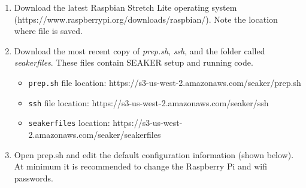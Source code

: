 \documentclass[12pt]{article}
\begin{document}
\begin{enumerate}
  \item Download the latest Raspbian Stretch Lite operating system\\
  (https://www.raspberrypi.org/downloads/raspbian/).
  Note the location where file is saved.
  \item Download the most recent copy of {\em prep.sh}, {\em \gls{ssh}}, and the 
  folder called {\em seakerfiles}. These files
  contain SEAKER setup and running code.
    \begin{itemize}
      \item \verb|prep.sh| file location: https://s3-us-west-2.amazonaws.com/seaker/prep.sh
      \item \verb|ssh| file location: https://s3-us-west-2.amazonaws.com/seaker/ssh
      \item \verb|seakerfiles| location: https://s3-us-west-2.amazonaws.com/seaker/seakerfiles
    \end{itemize}
  \item Open prep.sh and edit the default configuration information
  (shown below). At minimum it is recommended to change the Raspberry
  Pi and \gls{wifi} passwords.\\

  


\end{enumerate}
\end{document}
